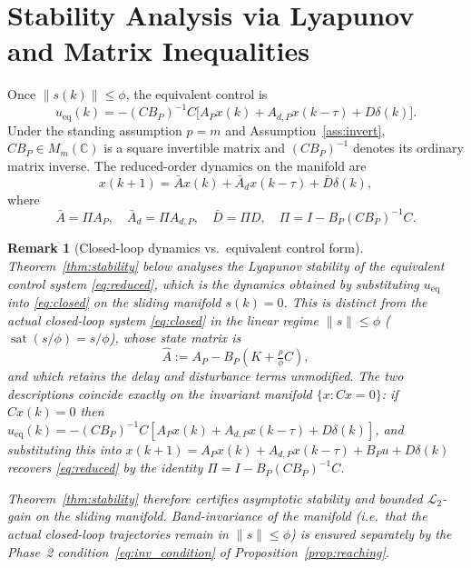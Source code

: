 \documentclass[10pt]{amsart}
\DeclareMathOperator{\sat}{sat}
\numberwithin{equation}{section}
\newtheorem{remark}[theorem]{Remark}
\begin{document}
\section{Stability Analysis via Lyapunov and Matrix Inequalities}\label{sec:stability}

Once \(\|s(k)\|\leq\phi\), the equivalent control is
\[
u_{\mathrm{eq}}(k) = -(C B_P)^{-1} C \bigl[A_P x(k) + A_{d,P} x(k-\tau) + D \delta(k)\bigr].
\]
Under the standing assumption $p = m$ and Assumption~\ref{ass:invert}, $CB_P \in
M_m(\mathbb{C})$ is a square invertible matrix and $(CB_P)^{-1}$ denotes its ordinary
matrix inverse. The reduced-order dynamics on the manifold are
\begin{equation}\label{eq:reduced}
x(k+1) = \bar{A} x(k) + \bar{A}_d x(k-\tau) + \bar{D} \delta(k),
\end{equation}
where
\[
\bar{A} = \Pi A_P,\quad
\bar{A}_d = \Pi A_{d,P},\quad
\bar{D} = \Pi D,\quad
\Pi = I - B_P (C B_P)^{-1} C.
\]

\begin{remark}[Closed-loop dynamics vs.\ equivalent control form]\label{rem:equiv_ctrl}
Theorem~\ref{thm:stability} below analyses the Lyapunov stability of the
\emph{equivalent control} system \eqref{eq:reduced}, which is the dynamics obtained
by substituting $u_{\mathrm{eq}}$ into \eqref{eq:closed} on the sliding manifold
$s(k)=0$. This is \emph{distinct} from the actual closed-loop system \eqref{eq:closed}
in the linear regime $\|s\|\leq\phi$ ($\sat(s/\phi)=s/\phi$), whose state matrix is
\[
  \hat{A} := A_P - B_P\!\left(K + \tfrac{\rho}{\phi}C\right),
\]
and which retains the delay and disturbance terms unmodified. The two descriptions
coincide exactly on the invariant manifold $\{x : Cx=0\}$: if $Cx(k)=0$ then
$u_{\mathrm{eq}}(k)=-(CB_P)^{-1}C[A_Px(k)+A_{d,P}x(k{-}\tau)+D\delta(k)]$, and
substituting this into
$x(k+1)=A_Px(k)+A_{d,P}x(k{-}\tau)+B_Pu+D\delta(k)$ recovers \eqref{eq:reduced}
by the identity $\Pi = I - B_P(CB_P)^{-1}C$.

Theorem~\ref{thm:stability} therefore certifies asymptotic stability and bounded
$\mathcal{L}_2$-gain \emph{on the sliding manifold}. Band-invariance of the manifold
(i.e.\ that the actual closed-loop trajectories remain in $\|s\|\leq\phi$) is ensured
separately by the Phase~2 condition~\eqref{eq:inv_condition} of
Proposition~\ref{prop:reaching}.
\end{remark}
\end{document}
